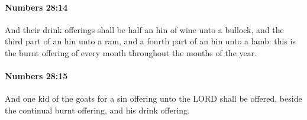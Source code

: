 		\paragraph{Numbers 28:14} %
			\label{NUMBERS-28-14}

			And their drink offerings shall be half an hin of wine unto a bullock, and the third part of an hin unto a ram, and a fourth part of an hin unto a lamb: this is the burnt offering of every month throughout the months of the year.


		\paragraph{Numbers 28:15} %
			\label{NUMBERS-28-15}

			And one kid of the goats for a sin offering unto the LORD shall be offered, beside the continual burnt offering, and his drink offering.


